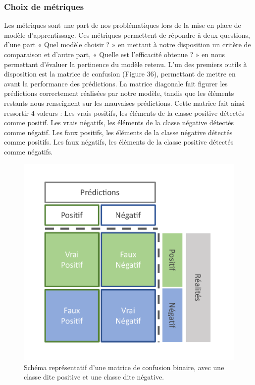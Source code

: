 \subsubsection{Choix de métriques}
Les métriques sont une part de nos problématiques lors de la mise en place de modèle d’apprentissage. Ces métriques permettent de répondre à deux questions, d’une part « Quel modèle choisir ? » en mettant à notre disposition un critère de comparaison et d’autre part, « Quelle est l’efficacité obtenue ? » en nous permettant d’évaluer la pertinence du modèle retenu.
L’un des premiers outils à disposition est la matrice de confusion (Figure 36), permettant de mettre en avant la performance des prédictions. La matrice diagonale fait figurer les prédictions correctement réalisées par notre modèle, tandis que les éléments restants nous renseignent sur les mauvaises prédictions. Cette matrice fait ainsi ressortir 4 valeurs :
	Les vrais positifs, les éléments de la classe positive détectés comme positif.
	Les vrais négatifs, les éléments de la classe négative détectés comme négatif.
	Les faux positifs, les éléments de la classe négative détectés comme positifs.
	Les faux négatifs, les éléments de la classe positive détectés comme négatifs.

\begin{figure}[H]
    \centering
    \includegraphics[width=\linewidth]{contents/chapter_3/resources/ConfusionMatrix.pdf}
    \caption{Schéma représentatif d’une matrice de confusion binaire, avec une classe dite positive et une classe dite négative.}
    \label{fig:chapter_3:confusion_matrix}
\end{figure}

